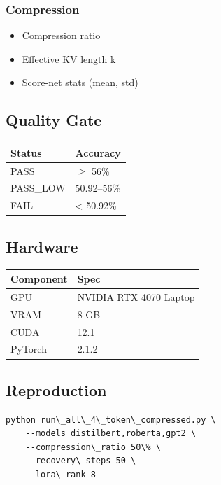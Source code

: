 \subsubsection{Compression}
\begin{itemize}
\item Compression ratio
\item Effective KV length k
\item Score-net stats (mean, std)

\end{itemize}
\subsection{Quality Gate}

\begin{table}[H]
\centering
\small
\begin{tabular}{ll}
\toprule
\textbf{Status} & \textbf{Accuracy} \\
\midrule
PASS & $\ge$ 56\% \\
PASS\_LOW & 50.92--56\% \\
FAIL & \textless{} 50.92\% \\
\bottomrule
\end{tabular}
\end{table}

\subsection{Hardware}

\begin{table}[H]
\centering
\small
\begin{tabular}{ll}
\toprule
\textbf{Component} & \textbf{Spec} \\
\midrule
GPU & NVIDIA RTX 4070 Laptop \\
VRAM & 8 GB \\
CUDA & 12.1 \\
PyTorch & 2.1.2 \\
\bottomrule
\end{tabular}
\end{table}

\subsection{Reproduction}

\begin{lstlisting}
python run\_all\_4\_token\_compressed.py \
    --models distilbert,roberta,gpt2 \
    --compression\_ratio 50\% \
    --recovery\_steps 50 \
    --lora\_rank 8
\end{lstlisting}

